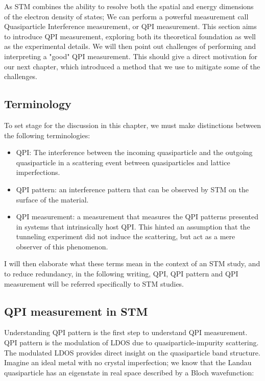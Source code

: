 As \ac{STM} combines the ability to resolve both the spatial and energy dimensions of the electron density of states; We can perform a powerful measurement call Quasiparticle Interference measurement, or \ac{QPI} measurement. This section aims to introduce \ac{QPI} measurement, exploring both its theoretical foundation as well as the experimental details. We will then point out challenges of performing and interpreting a "good" \ac{QPI} measurement. This should give a direct motivation for our next chapter, which introduced a method that we use to mitigate some of the challenges. 

\subsection{Terminology}
To set stage for the discussion in this chapter, we must make distinctions between the following terminologies: 
\begin{itemize}
	\item QPI: The interference between the incoming quasiparticle and the outgoing quasiparticle in a scattering event between quasiparticles and lattice imperfections.  
	\item QPI pattern: an interference pattern that can be observed by \ac{STM} on the surface of the material.
	\item QPI measurement: a measurement that measures the QPI patterns presented in systems that intrinsically host QPI. This hinted an assumption that the tunneling experiment did not induce the scattering, but act as a mere observer of this phenomenon.
\end{itemize}
I will then elaborate what these terms mean in the context of an STM study, and to reduce redundancy, in the following writing, QPI, QPI pattern and QPI measurement will be referred specifically to STM studies.

\subsection{QPI measurement in STM}
Understanding QPI pattern is the first step to understand QPI measurement. QPI pattern is the modulation of \ac{LDOS} due to quasiparticle-impurity scattering. The modulated \ac{LDOS} provides direct insight on the quasiparticle band structure. Imagine an ideal metal with no crystal imperfection; we know that the Landau quasiparticle has an eigenstate in real space described by a Bloch wavefunction: 

